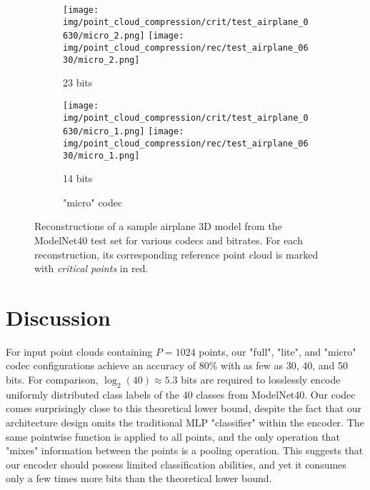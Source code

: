 \begin{figure}[t]
\begin{subfigure}[b]{\subfigureouterhspace}
    \hfill%
    \begin{subsubfigure}[b]{\subfigurehspace}
      \centering
      \texttt{[image: img/point\_cloud\_compression/crit/test\_airplane\_0630/micro\_2.png]}
      \texttt{[image: img/point\_cloud\_compression/rec/test\_airplane\_0630/micro\_2.png]}
      \caption{23 bits}
      \label{fig:rec/micro/2}
    \end{subsubfigure}%
    \hfill%
    \begin{subsubfigure}[b]{\subfigurehspace}
      \centering
      \texttt{[image: img/point\_cloud\_compression/crit/test\_airplane\_0630/micro\_1.png]}
      \texttt{[image: img/point\_cloud\_compression/rec/test\_airplane\_0630/micro\_1.png]}
      \caption{14 bits}
      \label{fig:rec/micro/1}
    \end{subsubfigure}%
    \caption{"micro" codec}
  \end{subfigure}%
  \caption[Reconstructed point cloud samples]{%
    Reconstructions of a sample airplane 3D model from the ModelNet40 test set for various codecs and bitrates.
    For each reconstruction, its corresponding reference point cloud is marked with \emph{critical points} in red.%
  }
  \label{fig:rec}
\end{figure}


\FloatBarrier




\section{Discussion}
\label{sec:discussion}

For input point clouds containing $P = 1024$ points, our "full", "lite", and "micro" codec configurations achieve an accuracy of 80\% with as few as 30, 40, and 50 bits.
For comparison, $\log_2(40) \approx 5.3$ bits are required to losslessly encode uniformly distributed class labels of the 40 classes from ModelNet40.
Our codec comes surprisingly close to this theoretical lower bound, despite the fact that our architecture design omits the traditional MLP "classifier" within the encoder.
The same pointwise function is applied to all points, and the only operation that "mixes" information between the points is a pooling operation.
This suggests that our encoder should possess limited classification abilities, and yet it consumes only a few times more bits than the theoretical lower bound.

